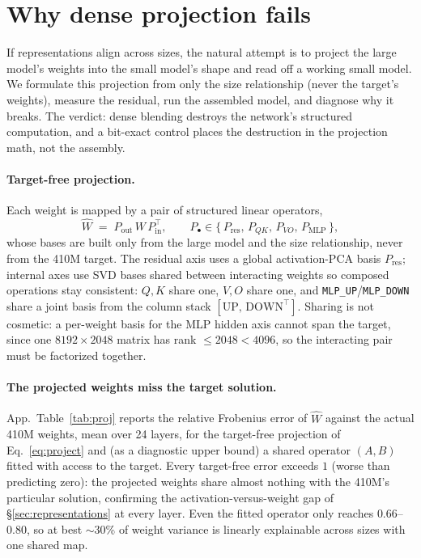 \section{Why dense projection fails}
\label{sec:projection}

If representations align across sizes, the natural attempt is to project the
large model's weights into the small model's shape and read off a working small
model. We formulate this projection from only the size relationship (never the
target's weights), measure the residual, run the assembled model, and diagnose
why it breaks. The verdict: dense blending destroys the network's structured
computation, and a bit-exact control places the destruction in the projection
math, not the assembly.

\paragraph{Target-free projection.}
Each weight is mapped by a pair of structured linear operators,
\begin{equation}
\hat{W} \;=\; P_{\text{out}}\, W\, P_{\text{in}}^{\top},
\qquad
P_{\bullet} \in \{\, P_{\text{res}},\, P_{QK},\, P_{VO},\, P_{\text{MLP}} \,\},
\label{eq:project}
\end{equation}
whose bases are built only from the large model and the size relationship,
never from the 410M target. The residual axis uses a global activation-PCA basis
$P_{\text{res}}$; internal axes use SVD bases shared between interacting
weights so composed operations stay consistent: $Q,K$ share one, $V,O$ share
one, and \texttt{MLP\_UP}/\texttt{MLP\_DOWN} share a joint basis from the column
stack $[\mathrm{UP},\,\mathrm{DOWN}^{\top}]$. Sharing is not cosmetic: a
per-weight basis for the MLP hidden axis cannot span the target, since one
$8192\times2048$ matrix has rank $\le 2048 < 4096$, so the interacting pair must
be factorized together.

\paragraph{The projected weights miss the target solution.}
App.~Table~\ref{tab:proj} reports the relative Frobenius error of $\hat{W}$ against
the actual 410M weights, mean over 24 layers, for the target-free projection of
Eq.~\ref{eq:project} and (as a diagnostic upper bound) a shared operator
$(A,B)$ fitted with access to the target. Every target-free error exceeds
$1$ (worse than predicting zero): the projected weights share almost nothing with
the 410M's particular solution, confirming the activation-versus-weight gap of
\S\ref{sec:representations} at every layer. Even the fitted operator only reaches
$0.66$--$0.80$, so at best $\sim$30\% of weight variance is linearly explainable
across sizes with one shared map.

